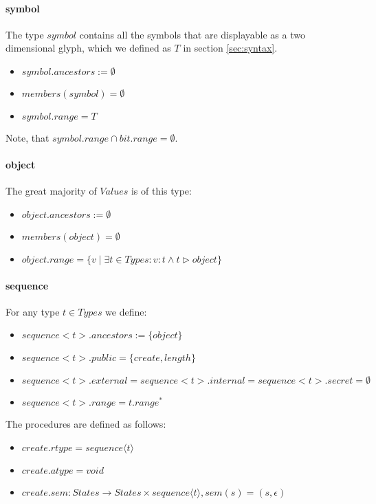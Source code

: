 \paragraph{symbol}

The type $symbol$ contains all the symbols that are displayable as a two dimensional glyph, which we defined as $T$ in section \ref{sec:syntax}.

\begin{itemize}
\item $symbol.ancestors := \emptyset$
\item $members(symbol) = \emptyset$
\item $symbol.range = T$
\end{itemize}

Note, that $symbol.range \cap bit.range = \emptyset$.

\paragraph{object}

The great majority of $Values$ is of this type:

\begin{itemize}
\item $object.ancestors := \emptyset$
\item $members(object) = \emptyset$
\item $object.range = \lbrace v \mid \exists t \in Types : v : t \wedge t \triangleright object \rbrace$
\end{itemize}

\paragraph{sequence}

For any type $t \in Types$ we define:

\begin{itemize}
\item $sequence<t>.ancestors := \lbrace object \rbrace$
\item $sequence<t>.public = \lbrace create, length\rbrace$
\item $sequence<t>.external = sequence<t>.internal = sequence<t>.secret = \emptyset$
\item $sequence<t>.range = t.range^\ast$
\end{itemize}

The procedures are defined as follows:

\begin{itemize}
\item $create.rtype = sequence \langle t \rangle$
\item $create.atype = void$
\item $create.sem: States  \rightarrow States \times sequence\langle t \rangle, sem(s) = (s, \epsilon)$
\end{itemize}

